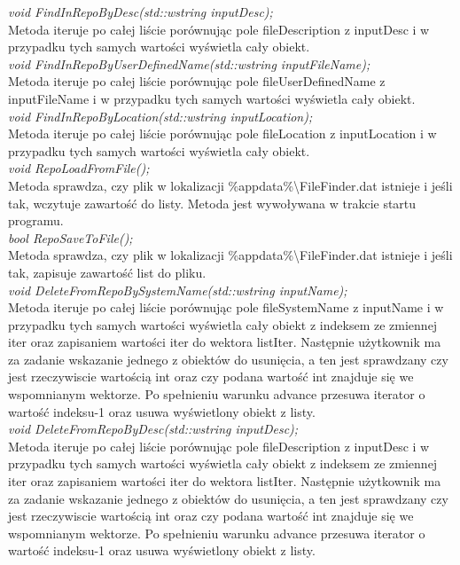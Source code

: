 \documentclass[10pt, a4paper]{article}
\begin{document}
\textit{void FindInRepoByDesc(std::wstring inputDesc);}\\
Metoda iteruje po całej liście porównując pole fileDescription z inputDesc i w przypadku tych samych wartości wyświetla cały obiekt.\\

\textit{void FindInRepoByUserDefinedName(std::wstring inputFileName);}\\
Metoda iteruje po całej liście porównując pole fileUserDefinedName z inputFileName i w przypadku tych samych wartości wyświetla cały obiekt.\\

\textit{void FindInRepoByLocation(std::wstring inputLocation);}\\
Metoda iteruje po całej liście porównując pole fileLocation z inputLocation i w przypadku tych samych wartości wyświetla cały obiekt.\\

\textit{void RepoLoadFromFile();}\\
Metoda sprawdza, czy plik w lokalizacji \%appdata\%\textbackslash FileFinder.dat istnieje i jeśli tak, wczytuje zawartość do listy. Metoda jest wywoływana w trakcie startu programu.\\

\textit{bool RepoSaveToFile();}\\
Metoda sprawdza, czy plik w lokalizacji \%appdata\%\textbackslash FileFinder.dat istnieje i jeśli tak, zapisuje zawartość list do pliku.\\

\textit{void DeleteFromRepoBySystemName(std::wstring inputName);}\\
Metoda iteruje po całej liście porównując pole fileSystemName z inputName i w przypadku tych samych wartości wyświetla cały obiekt z indeksem ze zmiennej iter oraz zapisaniem wartości iter do wektora listIter. Następnie użytkownik ma za zadanie wskazanie jednego z obiektów do usunięcia, a ten jest sprawdzany czy jest rzeczywiscie wartością int oraz czy podana wartość int znajduje się we wspomnianym wektorze. Po spełnieniu warunku advance przesuwa iterator o wartość indeksu-1 oraz usuwa wyświetlony obiekt z listy.\\

\textit{void DeleteFromRepoByDesc(std::wstring inputDesc);}\\
Metoda iteruje po całej liście porównując pole fileDescription z inputDesc i w przypadku tych samych wartości wyświetla cały obiekt z indeksem ze zmiennej iter oraz zapisaniem wartości iter do wektora listIter. Następnie użytkownik ma za zadanie wskazanie jednego z obiektów do usunięcia, a ten jest sprawdzany czy jest rzeczywiscie wartością int oraz czy podana wartość int znajduje się we wspomnianym wektorze. Po spełnieniu warunku advance przesuwa iterator o wartość indeksu-1 oraz usuwa wyświetlony obiekt z listy.\\
\end{document}

